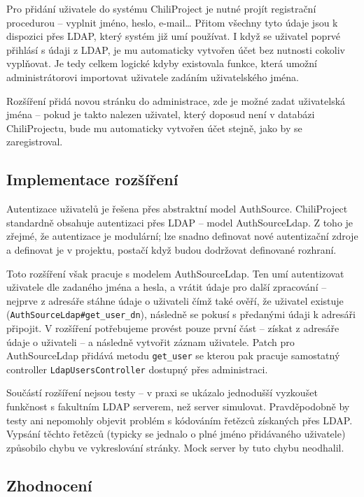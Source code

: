 \documentclass[thesis=B,czech]{FITthesis}[2012/05/02]
\begin{document}
Pro přidání uživatele do systému ChiliProject je nutné projít
registrační procedurou -- vyplnit jméno, heslo, e-mail\ldots{} Přitom
všechny tyto údaje jsou k dispozici přes \gls{LDAP}, který systém již
umí používat. I když se uživatel poprvé přihlásí s údaji z \gls{LDAP},
je mu automaticky vytvořen účet bez nutnosti cokoliv vyplňovat. Je tedy
celkem logické kdyby existovala funkce, která umožní administrátorovi
importovat uživatele zadáním uživatelského jména.

Rozšíření přidá novou stránku do administrace, zde je možné zadat
uživatelská jména -- pokud je takto nalezen uživatel, který doposud není
v databázi ChiliProjectu, bude mu automaticky vytvořen účet stejně, jako
by se zaregistroval.

\subsection{Implementace rozšíření}

Autentizace uživatelů je řešena přes abstraktní model AuthSource.
ChiliProject standardně obsahuje autentizaci přes \gls{LDAP} -- model
AuthSourceLdap. Z toho je zřejmé, že autentizace je modulární; lze
snadno definovat nové autentizační zdroje a definovat je v projektu,
postačí když budou dodržovat definované rozhraní.

Toto rozšíření však pracuje s modelem AuthSourceLdap. Ten umí
autentizovat uživatele dle zadaného jména a hesla, a vrátit údaje pro
další zpracování -- nejprve z adresáře stáhne údaje o uživateli čímž
také ověří, že uživatel existuje
(\lstinline!AuthSourceLdap#get_user_dn!), následně se pokusí s předanými
údaji k adresáři připojit. V rozšíření potřebujeme provést pouze první
část -- získat z adresáře údaje o uživateli -- a následně vytvořit
záznam uživatele. Patch pro AuthSourceLdap přidává metodu
\lstinline!get_user! se kterou pak pracuje samostatný controller
\lstinline!LdapUsersController! dostupný přes administraci.

Součástí rozšíření nejsou testy -- v praxi se ukázalo jednodušší
vyzkoušet funkčnost s fakultním LDAP serverem, než server simulovat.
Pravděpodobně by testy ani nepomohly objevit problém s kódováním řetězců
získaných přes LDAP. Vypsání těchto řetězců (typicky se jednalo o plné
jméno přidávaného uživatele) způsobilo chybu ve vykreslování stránky.
Mock server by tuto chybu neodhalil.

\subsection{Zhodnocení}
\end{document}
